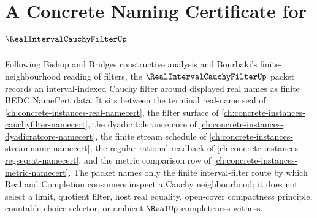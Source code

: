 \chapter{A Concrete Naming Certificate for $\RealIntervalCauchyFilterUp$}
\label{ch:concrete-instances-real-interval-cauchy-filter-namecert}

Following Bishop and Bridges constructive analysis and Bourbaki's finite-neighbourhood reading of filters, the $\RealIntervalCauchyFilterUp$ packet records an interval-indexed Cauchy filter around displayed real names as finite BEDC NameCert data. It sits between the terminal real-name seal of \autoref{ch:concrete-instances-real-namecert}, the filter surface of \autoref{ch:concrete-instances-cauchyfilter-namecert}, the dyadic tolerance core of \autoref{ch:concrete-instances-dyadicratcore-namecert}, the finite stream schedule of \autoref{ch:concrete-instances-streamname-namecert}, the regular rational readback of \autoref{ch:concrete-instances-regseqrat-namecert}, and the metric comparison row of \autoref{ch:concrete-instances-metric-namecert}. The packet names only the finite interval-filter route by which Real and Completion consumers inspect a Cauchy neighbourhood; it does not select a limit, quotient filter, host real equality, open-cover compactness principle, countable-choice selector, or ambient $\RealUp$ completeness witness.

